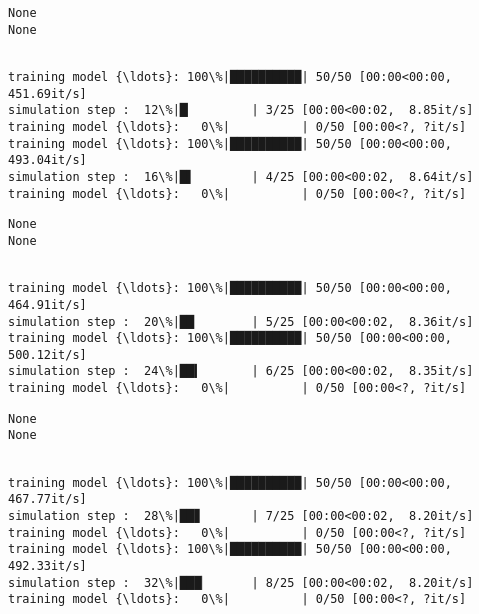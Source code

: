 \documentclass[11pt]{article}
\begin{document}
    \begin{Verbatim}[commandchars=\\\{\}]
None
None
    \end{Verbatim}

    \begin{Verbatim}[commandchars=\\\{\}]

training model {\ldots}: 100\%|██████████| 50/50 [00:00<00:00, 451.69it/s]
simulation step :  12\%|█▏        | 3/25 [00:00<00:02,  8.85it/s]
training model {\ldots}:   0\%|          | 0/50 [00:00<?, ?it/s]
training model {\ldots}: 100\%|██████████| 50/50 [00:00<00:00, 493.04it/s]
simulation step :  16\%|█▌        | 4/25 [00:00<00:02,  8.64it/s]
training model {\ldots}:   0\%|          | 0/50 [00:00<?, ?it/s]
    \end{Verbatim}

    \begin{Verbatim}[commandchars=\\\{\}]
None
None
    \end{Verbatim}

    \begin{Verbatim}[commandchars=\\\{\}]

training model {\ldots}: 100\%|██████████| 50/50 [00:00<00:00, 464.91it/s]
simulation step :  20\%|██        | 5/25 [00:00<00:02,  8.36it/s]
training model {\ldots}: 100\%|██████████| 50/50 [00:00<00:00, 500.12it/s]
simulation step :  24\%|██▍       | 6/25 [00:00<00:02,  8.35it/s]
training model {\ldots}:   0\%|          | 0/50 [00:00<?, ?it/s]
    \end{Verbatim}

    \begin{Verbatim}[commandchars=\\\{\}]
None
None
    \end{Verbatim}

    \begin{Verbatim}[commandchars=\\\{\}]

training model {\ldots}: 100\%|██████████| 50/50 [00:00<00:00, 467.77it/s]
simulation step :  28\%|██▊       | 7/25 [00:00<00:02,  8.20it/s]
training model {\ldots}:   0\%|          | 0/50 [00:00<?, ?it/s]
training model {\ldots}: 100\%|██████████| 50/50 [00:00<00:00, 492.33it/s]
simulation step :  32\%|███▏      | 8/25 [00:00<00:02,  8.20it/s]
training model {\ldots}:   0\%|          | 0/50 [00:00<?, ?it/s]
    \end{Verbatim}
\end{document}
